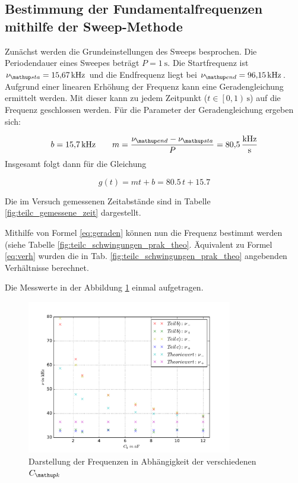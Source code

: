 \subsection{Bestimmung der Fundamentalfrequenzen mithilfe der Sweep-Methode}
Zunächst werden die Grundeinstellungen des Sweeps besprochen.
Die Periodendauer eines Sweepes beträgt $P=\SI{1}{\second}$.
Die Startfrequenz ist $\nu\ua{sta}=\SI{15.67}{\kilo\hertz}$ und die
Endfrequenz liegt bei $\nu\ua{end}=\SI{96.15}{\kilo\hertz}$.
Aufgrund einer linearen Erhöhung der Frequenz kann eine Geradengleichung ermittelt werden.
Mit dieser kann zu jedem Zeitpunkt ($t\in\left[0,1\right)\,\si{\second}$) auf die Frequenz geschlossen werden.
Für die Parameter der Geradengleichung ergeben sich:

\begin{equation*}
b=\SI{15.7}{\kilo\hertz} \qquad m=\frac{\nu\ua{end}-\nu\ua{sta}}{P}=\SI{80.5}{\kilo\hertz\per\second}
\end{equation*}
Insgesamt folgt dann für die Gleichung %

\begin{equation}
\label{eq:geraden}
g(t)=mt+b=80.5\,t+15.7
\end{equation}

Die im Versuch gemessenen Zeitabstände sind in Tabelle \ref{fig:teilc_gemessene_zeit} dargestellt.


Mithilfe von Formel \eqref{eq:geraden} können nun die Frequenz bestimmt werden (siehe Tabelle \ref{fig:teilc_schwingungen_prak_theo}.
Äquivalent zu Formel \eqref{eq:verh} wurden die in Tab. \ref{fig:teilc_schwingungen_prak_theo} angebenden Verhältnisse berechnet.

Die Messwerte in der Abbildung \ref{fig: plot} einmal aufgetragen. %
\begin{figure}
  \centering
  \includegraphics[width=0.8\textwidth]{pics/plot_frequenzen.pdf}
  \caption{Darstellung der Frequenzen in Abhängigkeit der verschiedenen $C\ua{k}$}
  \label{fig: plot}
\end{figure}
